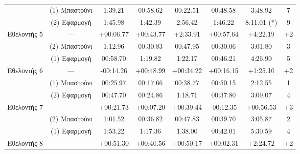 \begin{table}[!h]
{\begin{tabular}{c|c|c|c|c|c|c|c}
            & (1) Μπαστούνι & 1:39.21 & 00:58.62 & 00:22.51 & 00:48.58 & 3:48.92 & 7 \\
        \rowcolor[HTML]{EFEFEF}
        \cellcolor[HTML]{FFFFFF} & (2) Εφαρμογή  & 1:45.98 & 1:42.39 & 2:56.42 & 1:46.22 & 8:11.01 (*) & 9 \\
        \multirow{-3}{*}{Εθελοντής 5} & ---  & \cellcolor[HTML]{FD6864}+00:06.77 & \cellcolor[HTML]{FD6864}+00:43.77 & \cellcolor[HTML]{FD6864}+2:33.91 & \cellcolor[HTML]{FD6864}+00:57.64 & \cellcolor[HTML]{FD6864}+4:22.19 & \cellcolor[HTML]{FD6864}+2 \\ \hline
    
            & (2) Μπαστούνι & 1:12.96 & 00:30.83 & 00:47.95 & 00:30.06 & 3:01.80 & 3 \\
        \rowcolor[HTML]{EFEFEF}
        \cellcolor[HTML]{FFFFFF} & (1) Εφαρμογή  & 00:58.70 & 1:19.82 & 1:22.17 & 00:46.21 & 4:26.90 & 5 \\
        \multirow{-3}{*}{Εθελοντής 6} & ---  & \cellcolor[HTML]{9AFF99}-00:14.26 & \cellcolor[HTML]{FD6864}+00:48.99 & \cellcolor[HTML]{FD6864}+00:34.22 & \cellcolor[HTML]{FD6864}+00:16.15 & \cellcolor[HTML]{FD6864}+1:25.10 & \cellcolor[HTML]{FD6864}+2 \\ \hline
    
            & (1) Μπαστούνι & 00:25.97 & 00:17.66 & 00:38.77 & 00:50.15 & 2:12.55 & 1 \\
        \rowcolor[HTML]{EFEFEF}
        \cellcolor[HTML]{FFFFFF} & (2) Εφαρμογή  & 00:47.70 & 00:24.86 & 1:18.71 & 00:37.80 & 3:09.07 & 4 \\
        \multirow{-3}{*}{Εθελοντής 7} & ---  & \cellcolor[HTML]{FD6864}+00:21.73 & \cellcolor[HTML]{FD6864}+00:07.20 & \cellcolor[HTML]{FD6864}+00:39.44 & \cellcolor[HTML]{9AFF99}-00:12.35 & \cellcolor[HTML]{FD6864}+00:56.53 & \cellcolor[HTML]{FD6864}+3 \\ \hline
    
            & (2) Μπαστούνι & 1:01.52 & 00:36.82 & 00:47.83 & 00:39.70 & 3:05.87 & 2 \\
        \rowcolor[HTML]{EFEFEF}
        \cellcolor[HTML]{FFFFFF} & (1) Εφαρμογή  & 1:53.22 & 1:17.36 & 1:38.00 & 00:42.01 & 5:30.59 & 4 \\
        \multirow{-3}{*}{Εθελοντής 8} & ---  & \cellcolor[HTML]{FD6864}+00:51.30 & \cellcolor[HTML]{FD6864}+00:40.56 & \cellcolor[HTML]{FD6864}+00:50.17 & \cellcolor[HTML]{FD6864}+00:02.31 & \cellcolor[HTML]{FD6864}+2:24.72 & \cellcolor[HTML]{FD6864}+2 \\ \hline
    

\end{tabular}}
\end{table}
